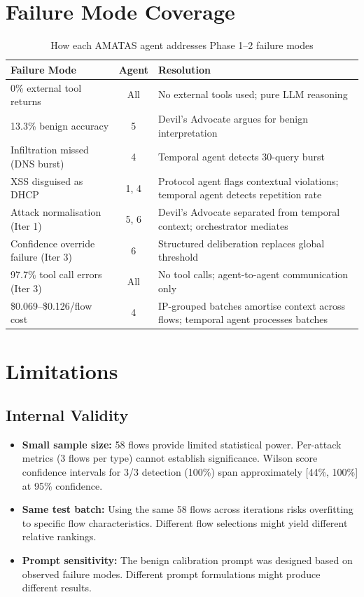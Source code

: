 \documentclass[12pt, a4paper, oneside]{report}
\begin{document}
\section{Failure Mode Coverage}

\begin{table}[H]
\centering
\caption{How each AMATAS agent addresses Phase 1--2 failure modes}
\label{tab:failure-coverage}
\small
\begin{tabular}{@{}p{4cm}cp{6cm}@{}}
\toprule
\textbf{Failure Mode} & \textbf{Agent} & \textbf{Resolution} \\
\midrule
0\% external tool returns & All & No external tools used; pure LLM reasoning \\
13.3\% benign accuracy & 5 & Devil's Advocate argues for benign interpretation \\
Infiltration missed (DNS burst) & 4 & Temporal agent detects 30-query burst \\
XSS disguised as DHCP & 1, 4 & Protocol agent flags contextual violations;
  temporal agent detects repetition rate \\
Attack normalisation (Iter 1) & 5, 6 & Devil's Advocate separated from temporal
  context; orchestrator mediates \\
Confidence override failure (Iter 3) & 6 & Structured deliberation replaces
  global threshold \\
97.7\% tool call errors (Iter 3) & All & No tool calls; agent-to-agent
  communication only \\
\$0.069--\$0.126/flow cost & 4 & IP-grouped batches amortise context across
  flows; temporal agent processes batches \\
\bottomrule
\end{tabular}
\end{table}


\section{Limitations}
\label{sec:limitations}

\subsection{Internal Validity}

\begin{itemize}
  \item \textbf{Small sample size:} 58 flows provide limited statistical power.
        Per-attack metrics (3 flows per type) cannot establish significance.
        Wilson score confidence intervals for 3/3 detection (100\%) span
        approximately [44\%, 100\%] at 95\% confidence.

  \item \textbf{Same test batch:} Using the same 58 flows across iterations
        risks overfitting to specific flow characteristics. Different flow
        selections might yield different relative rankings.

  \item \textbf{Prompt sensitivity:} The benign calibration prompt was designed
        based on observed failure modes. Different prompt formulations might
        produce different results.
\end{itemize}
\end{document}
